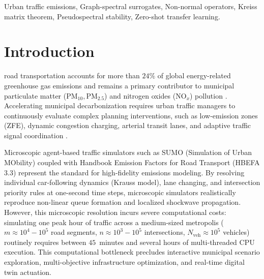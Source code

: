\documentclass[journal]{IEEEtran}
\begin{document}
\begin{IEEEkeywords}
Urban traffic emissions, Graph-spectral surrogates, Non-normal operators, Kreiss matrix theorem, Pseudospectral stability, Zero-shot transfer learning.
\end{IEEEkeywords}

\section{Introduction}

 road transportation accounts for more than $24\%$ of global energy-related greenhouse gas emissions and remains a primary contributor to municipal particulate matter ($\text{PM}_{10}, \text{PM}_{2.5}$) and nitrogen oxides ($\text{NO}_x$) pollution \cite{IEA2023, UN2022}. Accelerating municipal decarbonization requires urban traffic managers to continuously evaluate complex planning interventions, such as low-emission zones (ZFE), dynamic congestion charging, arterial transit lanes, and adaptive traffic signal coordination \cite{Bell1997, Sheffi1985}. 

Microscopic agent-based traffic simulators such as SUMO (Simulation of Urban MObility) \cite{Krajzewicz2012} coupled with Handbook Emission Factors for Road Transport (HBEFA 3.3) \cite{Keller2017} represent the standard for high-fidelity emissions modeling. By resolving individual car-following dynamics (Krauss model), lane changing, and intersection priority rules at one-second time steps, microscopic simulators realistically reproduce non-linear queue formation and localized shockwave propagation. However, this microscopic resolution incurs severe computational costs: simulating one peak hour of traffic across a medium-sized metropolis ($m \approx 10^4 - 10^5$ road segments, $n \approx 10^3 - 10^5$ intersections, $N_{\text{veh}} \approx 10^5$ vehicles) routinely requires between $45$~minutes and several hours of multi-threaded CPU execution. This computational bottleneck precludes interactive municipal scenario exploration, multi-objective infrastructure optimization, and real-time digital twin actuation.
\end{document}
